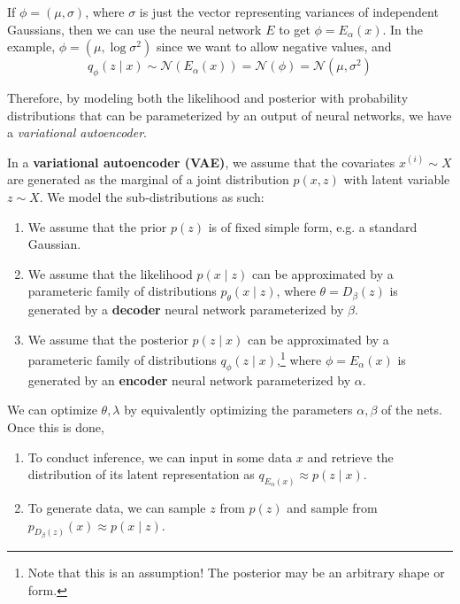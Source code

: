   \begin{example}
    \label{ex:encoder-neural-net-generates-parameters-of}
    If $\phi = (\mu, \sigma)$, where $\sigma$ is just the vector representing variances of independent Gaussians, then we can use the neural network $E$ to get $\phi = E_{\alpha} (x)$. In the example, $\phi = (\mu, \log \sigma^2)$ since we want to allow negative values, and 
    \begin{equation}
      q_\phi (z \mid x) \sim \mathcal{N}(E_\alpha (x)) = \mathcal{N}(\phi) = \mathcal{N} (\mu, \sigma^2)
    \end{equation}
  \end{example} 

  Therefore, by modeling both the likelihood and posterior with probability distributions that can be parameterized by an output of neural networks, we have a \textit{variational autoencoder}. 

  \begin{definition}
    \label{def:variational-autoencoders}
    In a \textbf{variational autoencoder (VAE)}, we assume that the covariates $x^{(i)} \sim X$ are generated as the marginal of a joint distribution $p(x, z)$ with latent variable $z \sim X$. We model the sub-distributions as such: 
    \begin{enumerate}
      \item We assume that the prior $p(z)$ is of fixed simple form, e.g. a standard Gaussian. 
      \item We assume that the likelihood $p(x \mid z)$ can be approximated by a parameteric family of distributions $p_\theta (x \mid z)$, where $\theta = D_\beta (z)$ is generated by a \textbf{decoder} neural network parameterized by $\beta$.
      \item We assume that the posterior $p(z \mid x)$ can be approximated by a parameteric family of distributions $q_\phi (z \mid x)$,\footnote{Note that this is an assumption! The posterior may be an arbitrary shape or form.} where $\phi = E_\alpha (x)$ is generated by an \textbf{encoder} neural network parameterized by $\alpha$.
    \end{enumerate} 
    We can optimize $\theta, \lambda$ by equivalently optimizing the parameters $\alpha, \beta$ of the nets. Once this is done, 
    \begin{enumerate}
      \item To conduct inference, we can input in some data $x$ and retrieve the distribution of its latent representation as $q_{E_\alpha (x)} \approx p (z \mid x)$. 
      \item To generate data, we can sample $z$ from $p(z)$ and sample from $p_{D_\beta (z)} (x) \approx p (x \mid z)$. 
    \end{enumerate}
  \end{definition} 

